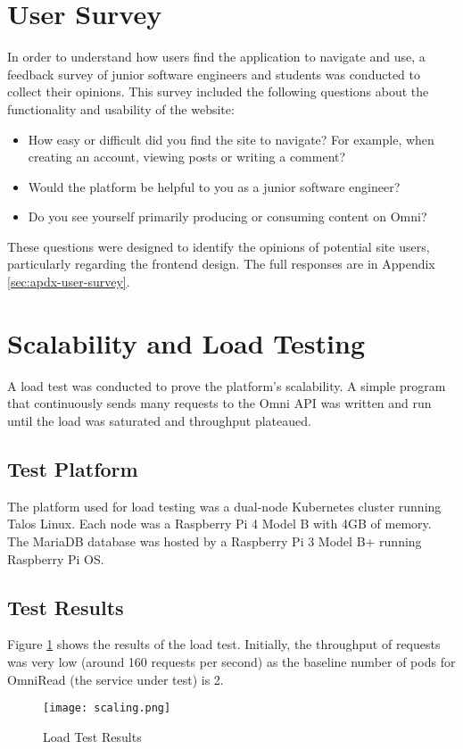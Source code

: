 \section{User Survey}
In order to understand how users find the application to navigate and use, a feedback survey of junior software engineers and students was conducted to collect their opinions.
This survey included the following questions about the functionality and usability of the website:
\begin{itemize}
    \item How easy or difficult did you find the site to navigate? For example, when creating an account, viewing posts or writing a comment?
    \item Would the platform be helpful to you as a junior software engineer?
    \item Do you see yourself primarily producing or consuming content on Omni?
\end{itemize}
These questions were designed to identify the opinions of potential site users, particularly regarding the frontend design.
The full responses are in Appendix \ref{sec:apdx-user-survey}.

\section{Scalability and Load Testing}
A load test was conducted to prove the platform's scalability.
A simple program that continuously sends many requests to the Omni API was written and run until the load was saturated and throughput plateaued.

\subsection{Test Platform}
The platform used for load testing was a dual-node Kubernetes cluster running Talos Linux.
Each node was a Raspberry Pi 4 Model B with 4GB of memory. The MariaDB database was hosted by a Raspberry Pi 3 Model B+ running Raspberry Pi OS.

\subsection{Test Results}
Figure \ref{fig:load-test-results} shows the results of the load test. Initially, the throughput of requests was very low (around 160 requests per second) as the baseline number of pods for OmniRead (the service under test) is 2.

\begin{figure}[htbp]
\texttt{[image: scaling.png]}
\centering
\caption{Load Test Results}
\label{fig:load-test-results}
\end{figure}


